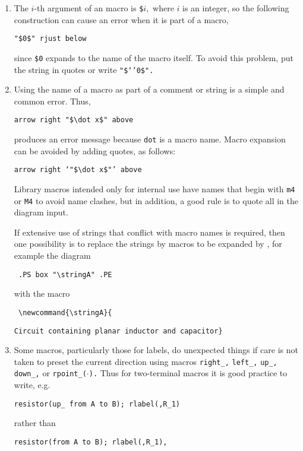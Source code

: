 \begin{enumerate}
\item 
{}
The $i$-th argument of an \Mfour macro is {\tt \$}$i,$ where $i$ is
an integer, so the following construction can cause an error when it
is part of a macro,

{\tt "\$0\$" rjust below}

\noindent since {\tt \$0} expands to the name of the macro itself.
To avoid this problem, put the string in quotes or write
 {\tt "\$`'0\$".}

\item 
{}
 Using the name of a macro as part of a comment or string is a
 simple and common error. Thus,

{\tt arrow right \verb|"$\dot x$"| above}

\noindent produces an error message because {\tt dot} is a macro
name.   Macro expansion can be avoided by adding quotes, as follows:

{\tt arrow right `\verb|"$\dot x$"|'\ above}

Library macros intended only for internal use have names that begin
with {\tt m4} or {\tt M4} to avoid name clashes, but in addition,
a good rule is to quote all \latex in the diagram input.

If extensive use of strings
that conflict with macro names is required, then one possibility is
to replace the strings by macros to be expanded by \latex, for example
the diagram

{\tt
.PS\hfill\break
   \hspace*{\parindent} box \verb|"\stringA"|\hfill\break
.PE
}

\noindent with the \latex macro

{\tt
  \verb|\newcommand{\stringA}{|%

   \verb|Circuit containing planar inductor and capacitor}|
}

\item 
{}
 Some macros, particularly those for labels, do
unexpected things if care is not taken to preset the current direction
using macros {\tt right\_,} {\tt left\_,} {\tt up\_,} {\tt down\_,}
or {\tt rpoint\_($\cdot$).}
Thus for two-terminal macros it is good practice to write, e.g.

{\tt resistor(up\_ from A to B); rlabel(,R\_1)}

\noindent%
rather than 

{\tt resistor(from A to B); rlabel(,R\_1),}


\end{enumerate}
